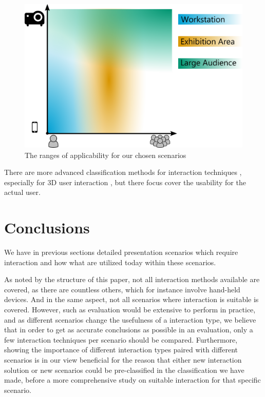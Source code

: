 \documentclass[review,journal]{vgtc}         %
\begin{document}
\begin{figure}[htb]
	\centering
	\includegraphics[width=1.0\linewidth]{expressivity.pdf}
	\caption{The ranges of applicability for our chosen scenarios}
	\label{scenario_diagram}
\end{figure}

There are more advanced classification methods for interaction techniques \cite{stars:65-93:2012}, especially for 3D user interaction \cite{CGF:CGF194, Kettner95aclassification, 978-3-319-07458-0_1}, but there focus cover the usability for the actual user.

\section{Conclusions}\label{sec:conclusion}

We have in previous sections detailed presentation scenarios which require interaction and how what are utilized today within these scenarios.

As noted by the structure of this paper, not all interaction methods available are covered, as there are countless others, which for instance involve hand-held devices. And in the same aspect, not all scenarios where interaction is suitable is covered. However, such as evaluation would be extensive to perform in practice, and as different scenarios change the usefulness of a interaction type, we believe that in order to get as accurate conclusions as possible in an evaluation, only a few interaction techniques per scenario should be compared. Furthermore, showing the importance of different interaction types paired with different scenarios is in our view beneficial for the reason that either new interaction solution or new scenarios could be pre-classified in the classification we have made, before a more comprehensive study on suitable interaction for that specific scenario.
\end{document}
